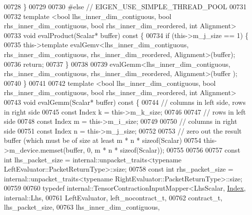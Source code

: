 \begin{DoxyCode}
00728   \}
00729 
00730 \textcolor{preprocessor}{#else  // EIGEN\_USE\_SIMPLE\_THREAD\_POOL}
00731 
00732   \textcolor{keyword}{template} <\textcolor{keywordtype}{bool} lhs\_inner\_dim\_contiguous, \textcolor{keywordtype}{bool} rhs\_inner\_dim\_contiguous, \textcolor{keywordtype}{bool} rhs\_inner\_dim\_reordered, \textcolor{keywordtype}{int}
       Alignment>
00733   \textcolor{keywordtype}{void} evalProduct(Scalar* buffer)\textcolor{keyword}{ const }\{
00734     \textcolor{keywordflow}{if} (this->m\_j\_size == 1) \{
00735       this->\textcolor{keyword}{template} evalGemv<lhs\_inner\_dim\_contiguous, rhs\_inner\_dim\_contiguous, rhs\_inner\_dim\_reordered,
       Alignment>(buffer);
00736       \textcolor{keywordflow}{return};
00737     \}
00738 
00739     evalGemm<lhs\_inner\_dim\_contiguous, rhs\_inner\_dim\_contiguous, rhs\_inner\_dim\_reordered, Alignment>(buffer
      );
00740   \}
00741 
00742   \textcolor{keyword}{template} <\textcolor{keywordtype}{bool} lhs\_inner\_dim\_contiguous, \textcolor{keywordtype}{bool} rhs\_inner\_dim\_contiguous, \textcolor{keywordtype}{bool} rhs\_inner\_dim\_reordered, \textcolor{keywordtype}{int}
       Alignment>
00743   \textcolor{keywordtype}{void} evalGemm(Scalar* buffer)\textcolor{keyword}{ const }\{
00744     \textcolor{comment}{// columns in left side, rows in right side}
00745     \textcolor{keyword}{const} Index k = this->m\_k\_size;
00746 
00747     \textcolor{comment}{// rows in left side}
00748     \textcolor{keyword}{const} Index m = this->m\_i\_size;
00749 
00750     \textcolor{comment}{// columns in right side}
00751     \textcolor{keyword}{const} Index n = this->m\_j\_size;
00752 
00753     \textcolor{comment}{// zero out the result buffer (which must be of size at least m * n * sizeof(Scalar)}
00754     this->m\_device.memset(buffer, 0, m * n * \textcolor{keyword}{sizeof}(Scalar));
00755 
00756 
00757     \textcolor{keyword}{const} \textcolor{keywordtype}{int} lhs\_packet\_size = internal::unpacket\_traits<typename LeftEvaluator::PacketReturnType>::size;
00758     \textcolor{keyword}{const} \textcolor{keywordtype}{int} rhs\_packet\_size = internal::unpacket\_traits<typename RightEvaluator::PacketReturnType>::size;
00759 
00760     \textcolor{keyword}{typedef} internal::TensorContractionInputMapper<LhsScalar, \hyperlink{namespace_eigen_a62e77e0933482dafde8fe197d9a2cfde}{Index}, internal::Lhs,
00761                                                    LeftEvaluator, left\_nocontract\_t,
00762                                                    contract\_t, lhs\_packet\_size,
00763                                                    lhs\_inner\_dim\_contiguous,

\end{DoxyCode}
